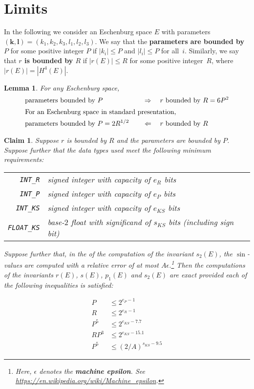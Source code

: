 \documentclass{article}
\newtheorem{lem}[thm]{Lemma}
\newtheorem{claim}[thm]{Claim}
\newcommand{\abs}[1]{\left|#1\right|}
\renewcommand{\vec}[1]{\mathbf{#1}}
\newcommand{\macheps}{\epsilon} %
\begin{document}
\section*{Limits}
In the following we consider an Eschenburg space \(E\) with parameters \((\vec k,\vec l) = (k_1,k_2,k_3,l_1,l_2,l_3)\).   We say that the \textbf{parameters are bounded by \(P\)} for some positive integer \(P\) if \(\abs{k_i}\leq P\) and \(\abs{l_i}\leq P\) for all~\(i\).  Similarly, we say that \textbf{\(r\) is bounded by \(R\)} if \(\abs{r(E)}\leq R\) for some positive integer~\(R\), where  \(\abs{r(E)} = |H^4(E)|\).

\begin{lem}\label{lem:P-vs-R}
  For any Eschenburg space, 
  \begin{alignat}{7}
    &\text{parameters bounded by } P &&\quad\Rightarrow\quad r \text{ bounded by } R = 6 P^2\\
    \intertext{%
    For an Eschenburg space in standard presentation,}
    &\text{parameters bounded by } P = 2R^{1/2} &&\quad\Leftarrow\quad r \text{ bounded by } R 
  \end{alignat}
\end{lem}


\begin{claim}\label{claim:bits}
  Suppose \(r\) is bounded by \(R\) and the parameters are bounded by \(P\).
  Suppose further that the data types used meet the following minimum requirements:
  \begin{center}
    \begin{tabular}{rp{\linewidth-5em}}
      \verb+INT_R+ & signed integer with capacity of \(e_R\) bits \\
      \verb+INT_P+ & signed integer with capacity of  \(e_P\) bits \\
      \verb+INT_KS+ & signed integer with capacity of  \(e_{KS}\) bits \\
      \verb+FLOAT_KS+ & base-\(2\) float with significand of \(s_{KS}\) bits (including sign bit)
    \end{tabular}
  \end{center}
  Suppose further that, in the of the computation of the invariant \(s_{2}(E)\), the \(\sin\)-values are computed with a relative error of at most \(A\macheps\).\footnote{
    Here, \(\macheps\) denotes the \textbf{machine epsilon}.
    See \url{https://en.wikipedia.org/wiki/Machine_epsilon}.
  }
  Then the computations of the invariants \(r(E)\), \(s(E)\), \(p_1(E)\) and \(s_2(E)\)
  are exact provided each of the following inequalities is satisfied:
  \begin{multicols}{3}
    \noindent\allowdisplaybreaks
  \begin{align*}
    P & \leq 2^{e_P-1}\\
    R & \leq 2^{e_R-1}\\
    P^5 &\leq 2^{e_{KS}-7.7}\\
    RP^3 &\leq 2^{e_{KS}-15.1} \\
    P^5 &\leq (2/A)^{s_{KS}-9.5}
  \end{align*}
  \end{multicols}
\end{claim}
\end{document}
